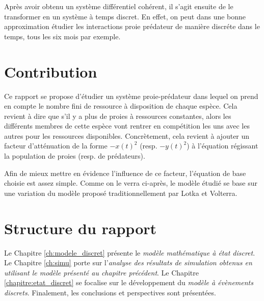 Après avoir obtenu un système différentiel cohérent, il s'agit ensuite de le transformer en un système à temps discret. En effet, on peut dans une bonne approximation étudier les interactions proie prédateur de manière discréte dans le temps, tous les six mois par exemple.

\section{Contribution}
\label{sec:Contribution}

Ce rapport se propose d'étudier un système proie-prédateur dans lequel on prend en compte le nombre fini de ressource à disposition de chaque espèce. Cela revient à dire que s'il y a plus de proies à ressources constantes, alors les différents membres de cette espèce vont rentrer en compétition les uns avec les autres pour les ressources disponibles.
Concrètement, cela revient à ajouter un facteur d'atténuation de la forme $- x(t)^2$ (resp. $- y(t)^2$) à l'équation régissant la population de proies (resp. de prédateurs).

Afin de mieux mettre en évidence l'influence de ce facteur, l'équation de base choisie est assez simple. Comme on le verra ci-après, le modèle étudié se base sur une variation du modèle proposé traditionnellement par Lotka et Volterra. 

\section{Structure du rapport}
\label{sec:Structure}

Le Chapitre \ref{ch:modele_discret} présente le \textit{modèle mathématique à état discret}. Le Chapitre \ref{ch:simu} porte sur l’\textit{analyse des résultats de simulation obtenus en utilisant le modèle présenté au chapitre précédent}. Le Chapitre \ref{chapitre:etat_discret} se focalise sur le développement du \textit{modèle à évènements discrets}. Finalement, les conclusions et perspectives sont présentées.
